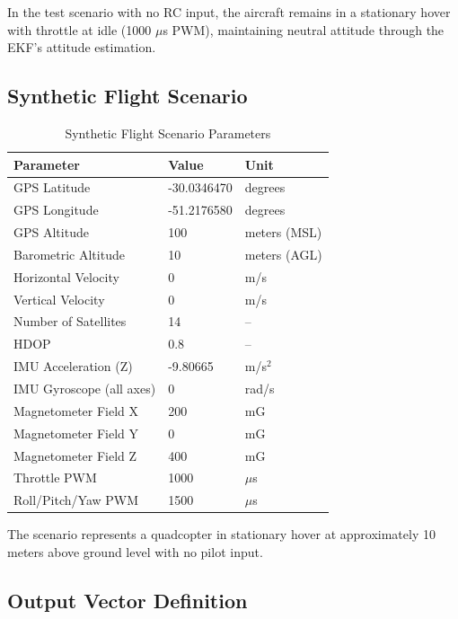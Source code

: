\documentclass[11pt,a4paper]{article}
\begin{document}
In the test scenario with no RC input, the aircraft remains in a stationary hover with throttle at idle (1000 $\mu$s PWM), maintaining neutral attitude through the EKF's attitude estimation.

\subsection{Synthetic Flight Scenario}

\begin{table}[H]
\centering
\caption{Synthetic Flight Scenario Parameters}
\label{tab:scenario_params}
\begin{tabular}{@{}lll@{}}
\toprule
\textbf{Parameter} & \textbf{Value} & \textbf{Unit} \\
\midrule
GPS Latitude & -30.0346470 & degrees \\
GPS Longitude & -51.2176580 & degrees \\
GPS Altitude & 100 & meters (MSL) \\
Barometric Altitude & 10 & meters (AGL) \\
Horizontal Velocity & 0 & m/s \\
Vertical Velocity & 0 & m/s \\
Number of Satellites & 14 & -- \\
HDOP & 0.8 & -- \\
IMU Acceleration (Z) & -9.80665 & m/s$^2$ \\
IMU Gyroscope (all axes) & 0 & rad/s \\
Magnetometer Field X & 200 & mG \\
Magnetometer Field Y & 0 & mG \\
Magnetometer Field Z & 400 & mG \\
Throttle PWM & 1000 & $\mu$s \\
Roll/Pitch/Yaw PWM & 1500 & $\mu$s \\
\bottomrule
\end{tabular}
\end{table}

The scenario represents a quadcopter in stationary hover at approximately 10 meters above ground level with no pilot input.

\subsection{Output Vector Definition}
\end{document}

